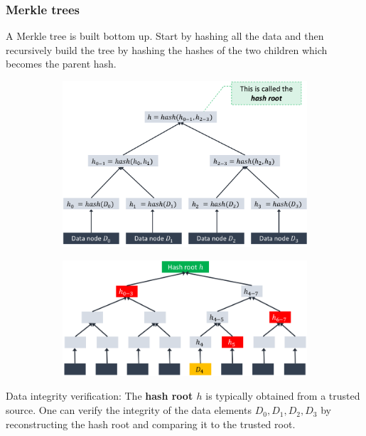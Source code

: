 \documentclass[11pt,oneside,a4paper]{article}
\begin{document}
\subsubsection{Merkle trees}

A Merkle tree is built bottom up. Start by hashing all the data and then recursively build the tree by hashing the hashes of the two children which becomes the parent hash.

\vspace{-\topsep}
\begin{figure}[hb]
	\centering
	\begin{subfigure}[t]{.5\textwidth}
		\centering
		\includegraphics[width=0.8\linewidth]{figures/merkle_tree}
		\label{fig:merkletree}
	\end{subfigure}%
	\begin{subfigure}[t]{.5\textwidth}
		\centering
		\includegraphics[width=1\linewidth]{figures/merkle_tree_verification}
		\label{fig:merkle_tree_verification}
	\end{subfigure}
\end{figure}
\vspace{-\topsep}

Data integrity verification: The \textbf{hash root $h$} is typically obtained from a trusted source. One can verify the integrity of the data elements $D_0, D_1, D_2, D_3$ by reconstructing the hash root and comparing it to the trusted root.\\
\end{document}
